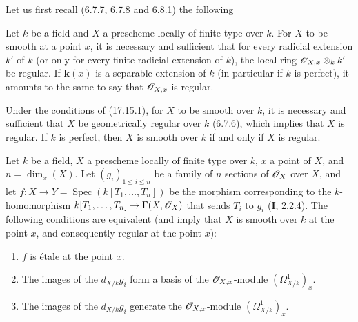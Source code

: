 Let us first recall (6.7.7, 6.7.8 and 6.8.1) the following

\begin{proposition}[17.15.1]
\label{IV.17.15.1}
Let $k$ be a field and $X$ a prescheme locally of finite type over $k$. For $X$ to be smooth at a point $x$, it is necessary and sufficient that for every radicial extension $k'$ of $k$ \textup{(or only for every} finite radicial \textup{extension of} $k$\textup{)}, the local ring $\mathscr{O}_{X,x}\otimes_k k'$ be regular. If $\boldsymbol{k}(x)$ is a separable extension of $k$ \textup{(in particular if} $k$ \textup{is} perfect\textup{)}, it amounts to the same to say that $\mathscr{O}_{X,x}$ is regular.
\end{proposition}

\begin{corollary}[17.15.2]
\label{IV.17.15.2}
Under the conditions of \textup{(17.15.1)}, for $X$ to be smooth over $k$, it is necessary and sufficient that $X$ be geometrically regular over $k$ \textup{(6.7.6)}, which implies that $X$ is regular. If $k$ is perfect, then $X$ is smooth over $k$ if and only if $X$ is regular.
\end{corollary}

\begin{proposition}[17.15.3]
\label{IV.17.15.3}
Let $k$ be a field, $X$ a prescheme locally of finite type over $k$, $x$ a point of $X$, and $n=\dim_x(X)$. Let $(g_i)_{1\leq i\leq n}$ be a family of $n$ sections of $\mathscr{O}_X$ over $X$, and let $f:X\to Y=\operatorname{Spec}(k[T_1,\ldots,T_n])$ be the morphism corresponding to the $k$-homomorphism $k[T_1,\ldots,T_n]\to\Gamma(X,\mathscr{O}_X)$ that sends $T_i$ to $g_i$ \textup{(\textbf{I}, 2.2.4)}. The following conditions are equivalent (and imply that $X$ is smooth over $k$ at the point $x$, \textup{and consequently} regular \textup{at the point} $x$):
\begin{enumerate}
  \item[\textup{a)}] $f$ is étale at the point $x$.
  \item[\textup{b)}] The images of the $d_{X/k}g_i$ form a basis of the $\mathscr{O}_{X,x}$-module $(\varOmega^1_{X/k})_x$.
  \item[\textup{c)}] The images of the $d_{X/k}g_i$ generate the $\mathscr{O}_{X,x}$-module $(\varOmega^1_{X/k})_x$.
\end{enumerate}
\end{proposition}

